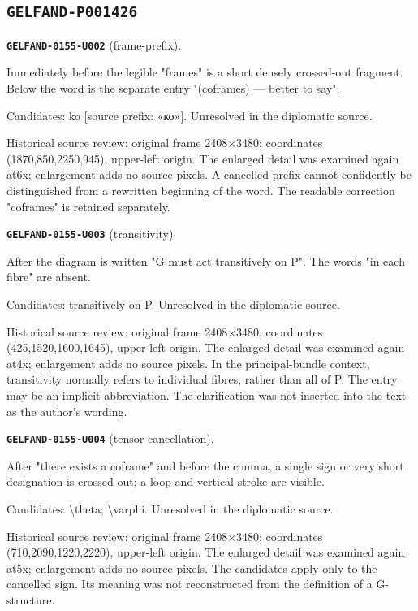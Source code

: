 \subsection*{\texttt{GELFAND-P001426}}
\par\noindent\leavevmode{}\label{GELFAND-0155-U002}\label{GELFAND-P001426:frame-prefix}\textbf{\texttt{GELFAND-0155-U002}} (frame-prefix).\nopagebreak[4]\par
Immediately before the legible "frames" is a short densely crossed-out fragment. Below the word is the separate entry "(coframes) — better to say".\par
Candidates: ko [source prefix: «ко»]. Unresolved in the diplomatic source.\par
Historical source review: original frame 2408×3480; coordinates (1870,850,2250,945), upper-left origin. The enlarged detail was examined again at6x; enlargement adds no source pixels. A cancelled prefix cannot confidently be distinguished from a rewritten beginning of the word. The readable correction "coframes" is retained separately.\par
\medskip
\par\noindent\leavevmode{}\label{GELFAND-0155-U003}\label{GELFAND-P001426:transitivity}\textbf{\texttt{GELFAND-0155-U003}} (transitivity).\nopagebreak[4]\par
After the diagram is written "G must act transitively on P". The words "in each fibre" are absent.\par
Candidates: transitively on P. Unresolved in the diplomatic source.\par
Historical source review: original frame 2408×3480; coordinates (425,1520,1600,1645), upper-left origin. The enlarged detail was examined again at4x; enlargement adds no source pixels. In the principal-bundle context, transitivity normally refers to individual fibres, rather than all of P. The entry may be an implicit abbreviation. The clarification was not inserted into the text as the author's wording.\par
\medskip
\par\noindent\leavevmode{}\label{GELFAND-0155-U004}\label{GELFAND-P001426:tensor-cancellation}\textbf{\texttt{GELFAND-0155-U004}} (tensor-cancellation).\nopagebreak[4]\par
After "there exists a coframe" and before the comma, a single sign or very short designation is crossed out; a loop and vertical stroke are visible.\par
Candidates: \textbackslash{}theta; \textbackslash{}varphi. Unresolved in the diplomatic source.\par
Historical source review: original frame 2408×3480; coordinates (710,2090,1220,2220), upper-left origin. The enlarged detail was examined again at5x; enlargement adds no source pixels. The candidates apply only to the cancelled sign. Its meaning was not reconstructed from the definition of a G-structure.\par
\medskip
